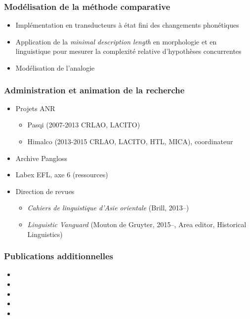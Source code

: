 \documentclass[xcolor=table]{beamer}
\begin{document}
   \begin{frame} 
 \frametitle{Modélisation de la méthode comparative} 
 \begin{itemize}%
 \item  Implémentation en transducteurs à état fini des changements phonétiques
  \item Application de la \textit{minimal description length} en morphologie et en linguistique pour mesurer la complexité relative d'hypothèses concurrentes
  \item Modélisation de l'analogie
\end{itemize}
   \end{frame} 
   
   \begin{frame} 
 \frametitle{Administration et animation de la recherche} 
 \begin{itemize}%
 \item  Projets ANR
  \begin{itemize}%
 \item  Pasqi (2007-2013 CRLAO, LACITO)
  \item Himalco (2013-2015 CRLAO, LACITO, HTL, MICA), coordinateur
\end{itemize}
 \item  Archive Pangloss
  \item Labex EFL, axe 6 (ressources)
  \item Direction de revues
    \begin{itemize}%
 \item  \textit{Cahiers de linguistique d'Asie orientale} (Brill, 2013--)
  \item \textit{Linguistic Vanguard} (Mouton de Gruyter, 2015--, Area editor, Historical Linguistics)
\end{itemize}
\end{itemize}
   \end{frame} 
 
 \begin{frame} 
 \frametitle{Publications additionnelles}

   \small
\begin{itemize}
\item  {}  
\item  {}  
\item  {}
\item  {}
\item  {}
\end{itemize}
 \end{frame}
\end{document}
